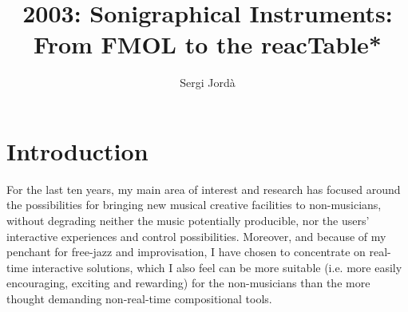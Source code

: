 \graphicspath{ {mainmatter/Jorda_2003/} }
\title*{2003: Sonigraphical Instruments: From FMOL to the reacTable*}

\author{Sergi Jord\`{a}}


%
%
\maketitle


\section{Introduction}

For the last ten years, my main area of interest and research has focused around
the possibilities for bringing  new musical creative facilities to non-musicians,
without degrading neither the music potentially producible, nor the users'
interactive experiences and control possibilities. Moreover,  and  because of my
penchant for free-jazz and improvisation,  I have chosen to concentrate on
real-time interactive solutions,  which I also feel  can  be  more  suitable 
(i.e.  more  easily  encouraging, exciting and rewarding) for the non-musicians
than the more thought demanding non-real-time compositional tools.

